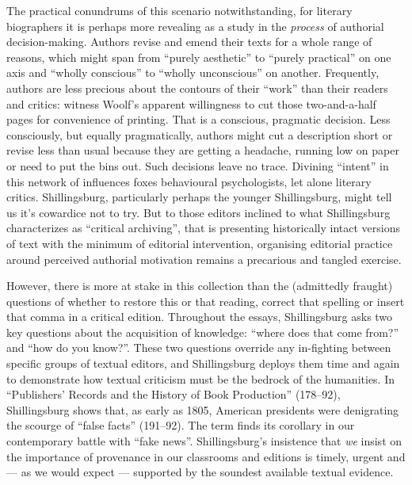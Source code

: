 \begin{review}
The practical conundrums of this scenario notwithstanding, for literary
biographers it is perhaps more revealing as a study in the
\emph{process} of authorial decision-making. Authors revise and emend
their texts for a whole range of reasons, which might span from ``purely
aesthetic'' to ``purely practical'' on one axis and ``wholly conscious''
to ``wholly unconscious'' on another. Frequently, authors are less
precious about the contours of their ``work'' than their readers and
critics: witness Woolf's apparent willingness to cut those
two-and-a-half pages for convenience of printing. That is a conscious,
pragmatic decision. Less consciously, but equally pragmatically, authors
might cut a description short or revise less than usual because they are
getting a headache, running low on paper or need to put the bins out.
Such decisions leave no trace. Divining ``intent'' in this network of
influences foxes behavioural psychologists, let alone literary critics.
Shillingsburg, particularly perhaps the younger Shillingsburg, might
tell us it's cowardice not to try. But to those editors inclined to what
Shillingsburg characterizes as ``critical archiving'', that is
presenting historically intact versions of text with the minimum of
editorial intervention, organising editorial practice around perceived
authorial motivation remains a precarious and tangled exercise.

However, there is more at stake in this collection than the (admittedly
fraught) questions of whether to restore this or that reading, correct
that spelling or insert that comma in a critical edition. Throughout the
essays, Shillingsburg asks two key questions about the acquisition of
knowledge: ``where does that come from?'' and ``how do you know?''.
These two questions override any in-fighting between specific groups of
textual editors, and Shillingsburg deploys them time and again to
demonstrate how textual criticism must be the bedrock of the humanities.
In ``Publishers' Records and the History of Book Production'' (178--92),
Shillingsburg shows that, as early as 1805, American presidents were
denigrating the scourge of ``false facts'' (191--92). The term finds its
corollary in our contemporary battle with ``fake news''. Shillingsburg's
insistence that \emph{we} insist on the importance of provenance in our
classrooms and editions is timely, urgent and --- as we would expect ---
supported by the soundest available textual evidence.
\end{review}